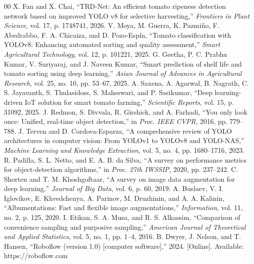 \documentclass[conference,pageno]{IEEEtran}
\begin{document}
\begin{thebibliography}{00}
 X. Fan and X. Chai, ``TRD-Net: An efficient tomato ripeness detection network based on improved YOLO v8 for selective harvesting,'' \textit{Frontiers in Plant Science}, vol. 17, p. 1748741, 2026.
 V. Moya, M. Guerra, K. Pazmiño, F. Abedrabbo, F. A. Chicaiza, and D. Pozo-Espín, ``Tomato classification with YOLOv8: Enhancing automated sorting and quality assessment,'' \textit{Smart Agricultural Technology}, vol. 12, p. 101221, 2025.
 G. Geetha, P. C. Prabhu Kumar, V. Suriyaraj, and J. Naveen Kumar, ``Smart prediction of shelf life and tomato sorting using deep learning,'' \textit{Asian Journal of Advances in Agricultural Research}, vol. 25, no. 10, pp. 53--67, 2025.
 A. Saxena, A. Agarwal, B. Nagrath, C. S. Jayavanth, S. Thulasidoss, S. Maheswari, and P. Sasikumar, ``Deep learning-driven IoT solution for smart tomato farming,'' \textit{Scientific Reports}, vol. 15, p. 31092, 2025.
 J. Redmon, S. Divvala, R. Girshick, and A. Farhadi, ``You only look once: Unified, real-time object detection,'' in \textit{Proc. IEEE CVPR}, 2016, pp. 779--788.
 J. Terven and D. Cordova-Esparza, ``A comprehensive review of YOLO architectures in computer vision: From YOLOv1 to YOLOv8 and YOLO-NAS,'' \textit{Machine Learning and Knowledge Extraction}, vol. 5, no. 4, pp. 1680--1716, 2023.
 R. Padilla, S. L. Netto, and E. A. B. da Silva, ``A survey on performance metrics for object-detection algorithms,'' in \textit{Proc. 27th IWSSIP}, 2020, pp. 237--242.
 C. Shorten and T. M. Khoshgoftaar, ``A survey on image data augmentation for deep learning,'' \textit{Journal of Big Data}, vol. 6, p. 60, 2019.
 A. Buslaev, V. I. Iglovikov, E. Khvedchenya, A. Parinov, M. Druzhinin, and A. A. Kalinin, ``Albumentations: Fast and flexible image augmentations,'' \textit{Information}, vol. 11, no. 2, p. 125, 2020.
 I. Etikan, S. A. Musa, and R. S. Alkassim, ``Comparison of convenience sampling and purposive sampling,'' \textit{American Journal of Theoretical and Applied Statistics}, vol. 5, no. 1, pp. 1--4, 2016.
 B. Dwyer, J. Nelson, and T. Hansen, ``Roboflow (version 1.0) [computer software],'' 2024. [Online]. Available: https://roboflow.com
\end{thebibliography}
\end{document}
